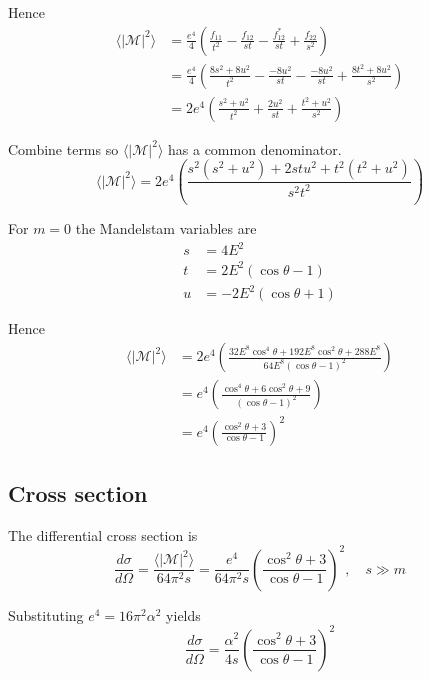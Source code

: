 \documentclass[12pt]{article}
\begin{document}
\noindent
Hence
\begin{align*}
\langle|\mathcal{M}|^2\rangle
&=\frac{e^4}{4}
\left(
\frac{f_{11}}{t^2} - \frac{f_{12}}{st} -
\frac{f_{12}^*}{st} + \frac{f_{22}}{s^2}
\right)
\\
&=\frac{e^4}{4}
\left(
\frac{8s^2+8u^2}{t^2} - \frac{-8u^2}{st} - \frac{-8u^2}{st} + \frac{8t^2+8u^2}{s^2}
\right)
\\
&=2e^4
\left(
\frac{s^2+u^2}{t^2} + \frac{2u^2}{st} + \frac{t^2+u^2}{s^2}
\right)
\end{align*}

\noindent
Combine terms so $\langle|\mathcal{M}|^2\rangle$ has a common denominator.
\begin{equation*}
\langle|\mathcal{M}|^2\rangle
=2e^4
\left(\frac{s^2\left(s^2+u^2\right)+2stu^2+t^2\left(t^2+u^2\right)}{s^2t^2}\right)
\end{equation*}

\noindent
For $m=0$ the Mandelstam variables are
\begin{align*}
s&=4E^2
\\
t&=2E^2(\cos\theta-1)
\\
u&=-2E^2(\cos\theta+1)
\end{align*}

\noindent
Hence
\begin{align*}
\langle|\mathcal{M}|^2\rangle
&=2e^4
\left(
\frac{32E^8\cos^4\theta+192E^8\cos^2\theta+288E^8}{64E^8(\cos\theta-1)^2}
\right)
\\
&=e^4
\left(
\frac{\cos^4\theta+6\cos^2\theta+9}{(\cos\theta-1)^2}
\right)
\\
&=e^4
\left(
\frac{\cos^2\theta+3}{\cos\theta-1}
\right)^2
\end{align*}

\subsection*{Cross section}
The differential cross section is
\begin{equation*}
\frac{d\sigma}{d\Omega}
=\frac{\langle|\mathcal{M}|^2\rangle}{64\pi^2s}
=\frac{e^4}{64\pi^2s}
\left(
\frac{\cos^2\theta+3}{\cos\theta-1}
\right)^2,\quad s\gg m
\end{equation*}

\noindent
Substituting $e^4=16\pi^2\alpha^2$ yields
\begin{equation*}
\frac{d\sigma}{d\Omega}
=\frac{\alpha^2}{4s}
\left(
\frac{\cos^2\theta+3}{\cos\theta-1}
\right)^2
\end{equation*}
\end{document}
